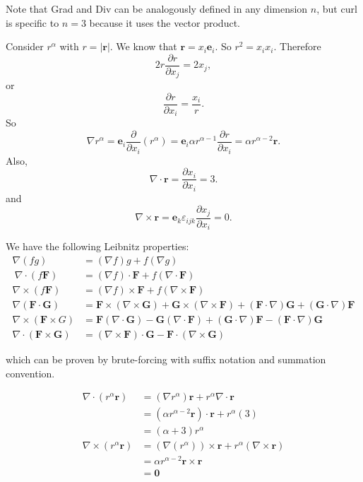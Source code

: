 \documentclass[a4paper]{article}
\begin{document}
Note that Grad and Div can be analogously defined in any dimension $n$, but curl is specific to $n = 3$ because it uses the vector product.

\begin{eg}
  Consider $r^\alpha$ with $r = |\mathbf{r}|$. We know that $\mathbf{r}= x_i\mathbf{e}_i$. So $r^2 = x_ix_i$. Therefore
  \[
    2r\frac{\partial r}{\partial x_j} = 2x_j,
  \]
  or
  \[
    \frac{\partial r}{\partial x_i} = \frac{x_i}{r}.
  \]
  So
  \[
    \nabla r^\alpha = \mathbf{e}_i \frac{\partial}{\partial x_i}(r^\alpha) = \mathbf{e}_i\alpha r^{\alpha - 1}\frac{\partial r}{\partial x_i} = \alpha r^{\alpha - 2}\mathbf{r}.
  \]
  Also,
  \[
    \nabla\cdot \mathbf{r} = \frac{\partial x_i}{\partial x_i} = 3.
  \]
  and
  \[
    \nabla \times \mathbf{r} = \mathbf{e}_k \varepsilon_{ijk}\frac{\partial x_j}{\partial x_i} = 0.
  \]
\end{eg}

\begin{prop}
  We have the following Leibnitz properties:
  \begin{align*}
    \nabla(fg) &= (\nabla f)g + f(\nabla g)\\\
    \nabla\cdot (f\mathbf{F}) &= (\nabla f)\cdot \mathbf{F} + f(\nabla\cdot \mathbf{F})\\
    \nabla\times (f\mathbf{F}) &= (\nabla f)\times \mathbf{F} + f(\nabla\times \mathbf{F})\\
    \nabla(\mathbf{F}\cdot \mathbf{G}) &= \mathbf{F}\times (\nabla \times \mathbf{G}) + \mathbf{G}\times (\nabla \times \mathbf{F}) + (\mathbf{F}\cdot \nabla)\mathbf{G} + (\mathbf{G}\cdot \nabla) \mathbf{F}\\
    \nabla \times (\mathbf{F}\times G) &= \mathbf{F}(\nabla\cdot \mathbf{G}) - \mathbf{G}(\nabla\cdot \mathbf{F}) + (\mathbf{G}\cdot \nabla)\mathbf{F} - (\mathbf{F}\cdot \nabla)\mathbf{G}\\
    \nabla\cdot (\mathbf{F}\times \mathbf{G}) &= (\nabla\times \mathbf{F})\cdot \mathbf{G} - \mathbf{F}\cdot (\nabla\times \mathbf{G})
  \end{align*}
\end{prop}
which can be proven by brute-forcing with suffix notation and summation convention.

\begin{eg}
  \begin{align*}
    \nabla\cdot (r^\alpha \mathbf{r}) &= (\nabla r^\alpha)\mathbf{r} + r^\alpha \nabla\cdot \mathbf{r}\\
    &= (\alpha r^{\alpha - 2}\mathbf{r})\cdot \mathbf{r} + r^\alpha (3)\\
    &= (\alpha + 3)r^\alpha\\
    \nabla\times (r^\alpha \mathbf{r}) &= (\nabla(r^\alpha))\times \mathbf{r} + r^\alpha(\nabla\times \mathbf{r})\\
    &= \alpha r^{\alpha - 2} \mathbf{r}\times \mathbf{r}\\
    &= \mathbf{0}
  \end{align*}
\end{eg}
\end{document}
